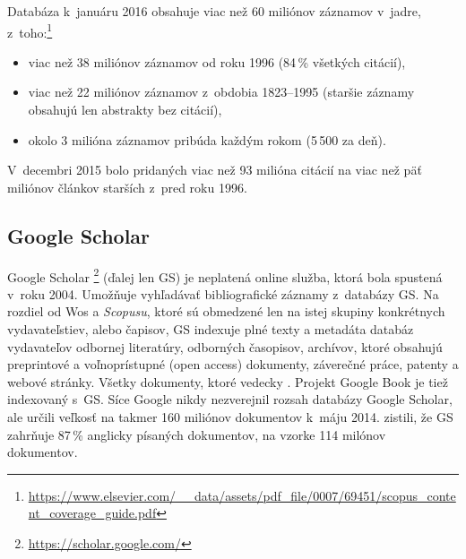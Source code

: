 Databáza k~januáru 2016 obsahuje viac než 60 miliónov záznamov v~jadre, z~toho:\footnote{\url{https://www.elsevier.com/__data/assets/pdf_file/0007/69451/scopus_content_coverage_guide.pdf}}

\begin{itemize}
  \item viac než 38 miliónov záznamov od roku 1996 (84\,\% všetkých citácií),
  \item viac než 22 miliónov záznamov z~obdobia 1823--1995 (staršie záznamy
    obsahujú len abstrakty bez citácií),
  \item okolo 3 milióna záznamov pribúda každým rokom (5\,500 za deň).
\end{itemize}

V~decembri 2015 bolo pridaných viac než 93 milióna citácií na viac než päť
miliónov článkov starších z~pred roku
1996.

\subsection{Google Scholar}
\label{sec:gs}

Google Scholar \footnote{\url{https://scholar.google.com/}} (ďalej len GS) je neplatená online
služba, ktorá bola spustená v~roku 2004.  Umožňuje vyhľadávať bibliografické
záznamy z~databázy GS. Na rozdiel od Wos a \emph{Scopusu}, ktoré sú obmedzené
len na istej skupiny konkrétnych vydavateľstiev, alebo čapisov, GS indexuje
plné texty a metadáta databáz vydavateľov odbornej literatúry, odborných
časopisov, archívov, ktoré obsahujú preprintové a voľnoprístupné (open access)
dokumenty, záverečné práce, patenty a webové stránky. Všetky dokumenty, ktoré
 vedecky \citep{Vine2006}.  Projekt Google Book je tiež indexovaný
s~GS.  Síce Google nikdy nezverejnil rozsah databázy Google Scholar, ale
\citet{Orduna-Malea2015} určili veľkosť na takmer 160 miliónov dokumentov k~máju
2014. \citet{Khabsa2014} zistili, že GS zahrňuje 87\,\% anglicky písaných
dokumentov, na vzorke 114 milónov dokumentov.

